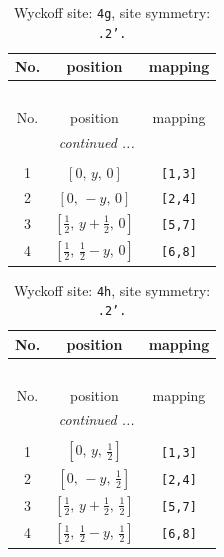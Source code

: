 \documentclass[fleqn,8pt]{jsarticle}
\begin{document}
\renewcommand{\arraystretch}{1.2}
\begin{longtable}{ccc}
\caption{Wyckoff site: {\tt 4g}, site symmetry: {\tt .2'.}}
 \\
 \hline \hline
No. & position & mapping \\ \hline \endfirsthead

\multicolumn{2}{l}{\tablename\ \thetable{}} \\
 \hline \hline
No. & position & mapping \\ \hline \endhead

 \hline \hline
\multicolumn{2}{r}{\footnotesize\it continued ...} \\ \endfoot

 \hline \hline
\multicolumn{2}{r}{} \\ \endlastfoot

1 & $\left[ 0,\, y,\, 0 \right]$ & {\tt [1,3]} \\ \hline
2 & $\left[ 0,\, - y,\, 0 \right]$ & {\tt [2,4]} \\ \hline
3 & $\left[ \frac{1}{2},\, y + \frac{1}{2},\, 0 \right]$ & {\tt [5,7]} \\ \hline
4 & $\left[ \frac{1}{2},\, \frac{1}{2} - y,\, 0 \right]$ & {\tt [6,8]} \\
\end{longtable}
\renewcommand{\arraystretch}{1.2}
\begin{longtable}{ccc}
\caption{Wyckoff site: {\tt 4h}, site symmetry: {\tt .2'.}}
 \\
 \hline \hline
No. & position & mapping \\ \hline \endfirsthead

\multicolumn{2}{l}{\tablename\ \thetable{}} \\
 \hline \hline
No. & position & mapping \\ \hline \endhead

 \hline \hline
\multicolumn{2}{r}{\footnotesize\it continued ...} \\ \endfoot

 \hline \hline
\multicolumn{2}{r}{} \\ \endlastfoot

1 & $\left[ 0,\, y,\, \frac{1}{2} \right]$ & {\tt [1,3]} \\ \hline
2 & $\left[ 0,\, - y,\, \frac{1}{2} \right]$ & {\tt [2,4]} \\ \hline
3 & $\left[ \frac{1}{2},\, y + \frac{1}{2},\, \frac{1}{2} \right]$ & {\tt [5,7]} \\ \hline
4 & $\left[ \frac{1}{2},\, \frac{1}{2} - y,\, \frac{1}{2} \right]$ & {\tt [6,8]} \\
\end{longtable}
\end{document}
